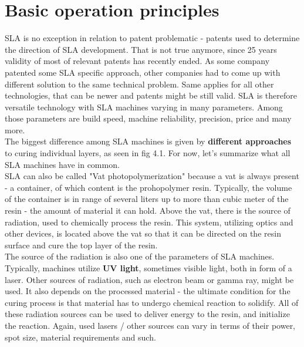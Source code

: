 \documentclass[a4paper, twoside, 11pt]{report}
\begin{document}
\section{Basic operation principles}
SLA is no exception in relation to patent problematic - patents used to determine the direction of SLA development. That is not true anymore, since 25 years validity of most of relevant patents has recently ended. As some company patented some SLA specific approach, other companies had to come up with different solution to the same technical problem. Same applies for all other technologies, that can be newer and patents might be still valid. SLA is therefore versatile technology with SLA machines varying in many parameters. Among those parameters are build speed, machine reliability, precision, price and many more.\\
The biggest difference among SLA machines is given by \textbf{different approaches} to curing individual layers, as seen in fig 4.1. For now, let's summarize what all SLA machines have in common.
\\SLA can also be called "Vat photopolymerization" because a vat is always present - a container, of which content is the prohopolymer resin. Typically, the volume of the container is in range of several liters up to more than cubic meter of the resin - the amount of material it can hold. Above the vat, there is the source of radiation, used to chemically process the resin. This system, utilizing optics and other devices, is located above the vat so that it can be directed on the resin surface and cure the top layer of the resin.\\
The source of the radiation is also one of the parameters of SLA machines. Typically, machines utilize \textbf{UV light}, sometimes visible light, both in form of a laser. Other sources of radiation, such as electron beam or gamma ray, might be used. It also depends on the processed material - the ultimate condition for the curing process is that material has to undergo chemical reaction to solidify. All of these radiation sources can be used to deliver energy to the resin, and initialize the reaction. Again, used lasers / other sources can vary in terms of their power, spot size, material requirements and such.
\end{document}
